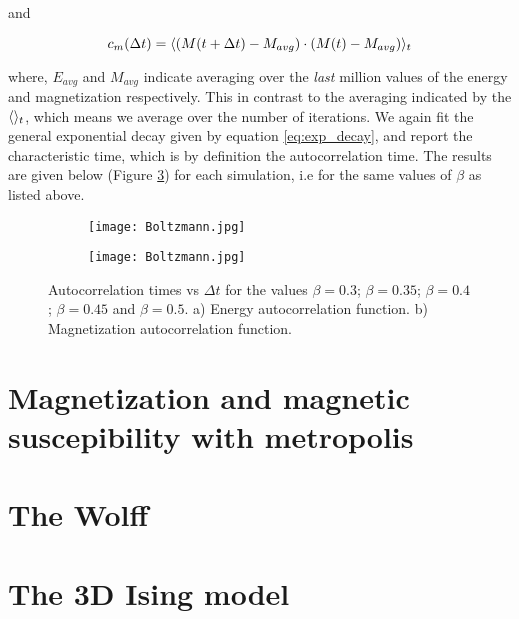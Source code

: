 \documentclass[11pt,a4paper]{article}
\DeclarePairedDelimiter{\avg}{\langle}{\rangle}
\begin{document}
and

\begin{equation*}
    c_m(\Delta t) = \avg{(M(t+\Delta t) - M_{avg})\cdot (M(t)-M_{avg})}_t
\end{equation*}


where, $E_{avg}$ and $M_{avg}$ indicate averaging over the \textit{last} million values of the energy and magnetization
 respectively. This in contrast to the averaging indicated by the $\avg{}_t$, which means we average over the number of
 iterations. We again fit the general exponential decay given by equation \ref{eq:exp_decay}, and report the characteristic
 time, which is by definition the autocorrelation time. The results are given below (Figure \ref{fig:autocorr})
 for each simulation, i.e for the same values of $\beta$ as listed above.
 
\begin{figure}[h!]
\centering
\begin{subfigure}{.5\textwidth}
  \centering
  \texttt{[image: Boltzmann.jpg]}
  \caption{}
  \label{fig:autocorr_energy}
\end{subfigure}%
\begin{subfigure}{.5\textwidth}
  \centering
  \texttt{[image: Boltzmann.jpg]}
  \caption{}
  \label{fig:autocorr_mag}
\end{subfigure}
\caption{Autocorrelation times vs $\Delta t$ for the values $\beta = 0.3$; $\beta = 0.35$;
         $\beta = 0.4$; $\beta = 0.45$ and $\beta = 0.5$. a) Energy autocorrelation function. 
         b) Magnetization autocorrelation function.}
\label{fig:autocorr}
\end{figure}





\section{Magnetization and magnetic suscepibility with metropolis}

\section{The Wolff}

\section{The 3D Ising model}
\end{document}
